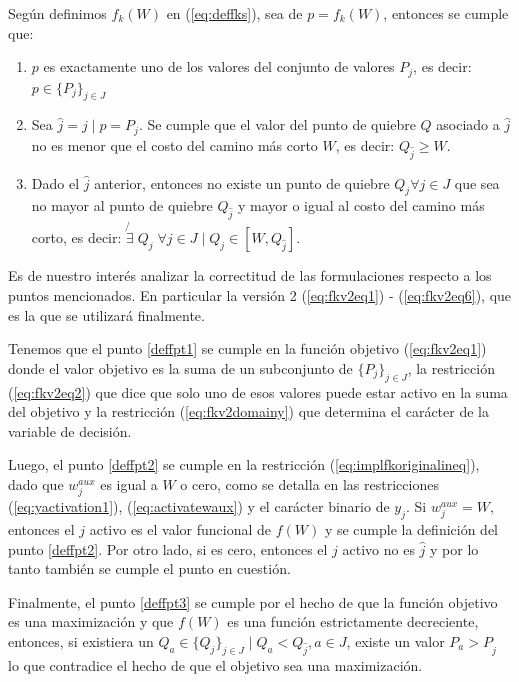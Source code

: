 \documentclass{article}
\begin{document}
  Según definimos $f_k(W)$ en (\ref{eq:deffks}), sea de $p = f_k(W)$, entonces se cumple que:

  \begin{enumerate}
    \item {\label{deffpt1} $p$ es exactamente uno de los valores del conjunto de valores $P_j$, es decir: $p \in \{P_j\}_{j \in J}$}
    \item {\label{deffpt2} Sea $\hat{j} = j \;|\; p = P_j$. Se cumple que el valor del punto de quiebre $Q$ asociado a $\hat{j}$ no es menor que el costo del camino más corto $W$, es decir: $Q_{\hat{j}} \geq W$.}
    \item {\label{deffpt3} Dado el $\hat{j}$ anterior, entonces no existe un punto de quiebre $Q_j \forall j \in J$ que sea no mayor al punto de quiebre $Q_{\hat{j}}$ y mayor o igual al costo del camino más corto, es decir: $\not{\exists}\; Q_j\; \forall j \in J \;|\; Q_j \in  [W, Q_{\hat{j}}]$}.
  \end{enumerate}

  Es de nuestro interés analizar la correctitud de las formulaciones respecto a los puntos mencionados. En particular la versión 2 (\ref{eq:fkv2eq1}) - (\ref{eq:fkv2eq6}), que es la que se utilizará finalmente.

  Tenemos que el punto \ref{deffpt1} se cumple en la función objetivo (\ref{eq:fkv2eq1}) donde el valor objetivo es la suma de un subconjunto de $\{P_j\}_{j \in J}$, la restricción (\ref{eq:fkv2eq2}) que dice que solo uno de esos valores puede estar activo en la suma del objetivo y la restricción (\ref{eq:fkv2domainy}) que determina el carácter de la variable de decisión.

  Luego, el punto \ref{deffpt2} se cumple en la restricción (\ref{eq:implfkoriginalineq}), dado que $w^{aux}_j$ es igual a $W$ o cero, como se detalla en las restricciones (\ref{eq:yactivation1}), (\ref{eq:activatewaux}) y el carácter binario de $y_j$. Si $w^{aux}_j = W$, entonces el $j$ activo es el valor funcional de $f(W)$ y se cumple la definición del punto \ref{deffpt2}. Por otro lado, si es cero, entonces el $j$ activo no es $\hat{j}$ y por lo tanto también se cumple el punto en cuestión.

  Finalmente, el punto \ref{deffpt3} se cumple por el hecho de que la función objetivo es una maximización y que $f(W)$ es una función estrictamente decreciente, entonces, si existiera un $Q_a \in \{Q_j\}_{j \in J} \;|\; Q_a < Q_{\hat{j}}, a \in J$, existe un valor $P_a > P_{\hat{j}}$ lo que contradice el hecho de que el objetivo sea una maximización.
\end{document}

